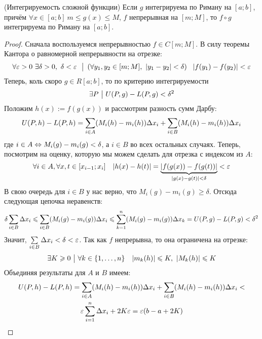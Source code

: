 \begin{theorem} (Интегрируемость сложной функции)
	Если $g$ интегрируема по Риману на $[a; b]$, причём $\forall x \in [a; b]\ m \le g(x) \le M$, $f$ непрерывная на $[m; M]$, то $f \circ g$ интегрируема по Риману на $[a; b]$.
\end{theorem}

\begin{proof}
	Сначала воспользуемся непрерывностью $f \in C[m; M]$. В силу теоремы Кантора о равномерной непрерывности на отрезке:
	\[
		\forall \eps > 0\ \exists \delta > 0,\ \delta < \eps\ \such \left(\forall y_1, y_2 \in [m; M],\ |y_1 - y_2| < \delta\right)\ \ |f(y_1) - f(y_2)| < \eps
	\]
	Теперь, коль скоро $g \in R[a; b]$, то по критерию интегрируемости
	\[
		\exists P \ \big|\  U(P, g) - L(P, g) < \delta^2
	\]
	Положим $h(x) := f(g(x))$ и рассмотрим разность сумм Дарбу:
	\[
		U(P, h) - L(P, h) = \sum\limits_{i \in A} (M_i(h) - m_i(h))\Delta x_i + \sum\limits_{i \in B} (M_i(h) - m_i(h)) \Delta x_i
	\]
	где $i \in A \Leftrightarrow M_i(g) - m_i(g) < \delta$, а $i \in B$ во всех остальных случаях. Теперь, посмотрим на оценку, которую мы можем сделать для отрезка с индексом из $A$:
	\[
		\forall i \in A, \forall x, t \in [x_{i - 1}; x_i] \quad |h(x) - h(t)| = \underbrace{|f(g(x)) - f(g(t))|}_{|g(x) - g(t)| < \delta} < \varepsilon
	\]
	В свою очередь для $i \in B$ у нас верно, что $M_i(g) - m_i(g) \ge \delta$. Отсюда следующая цепочка неравенств:
	\[
		\delta \sum\limits_{i \in B} \Delta x_i \leqslant \sum\limits_{i \in B} (M_i(g) - m_i(g)) \Delta x_i \leqslant \sum\limits_{k = 1}^n (M_i(g) - m_i(g)) \Delta x_k = U(P, g) - L(P, g) < \delta^2
	\]
	Значит, $\sum\limits_{i \in B} \Delta x_i < \delta < \varepsilon$. Так как $f$ непрерывна, то она ограничена на отрезке:
	\[
		\exists K \geqslant 0 \ \big|\  \forall k \in \{1, \ldots, n\} \quad |m_k(h)| \leqslant K,\ |M_k(h)| \leqslant K
	\]
	Объединяя результаты для $A$ и $B$ имеем:
	\begin{multline*}
		U(P, h) - L(P, h) = \sum\limits_{i \in A} (M_i(h) - m_i(h)) \Delta x_i + \sum\limits_{i \in B} (M_i(h) - m_i(h)) \Delta x_i <
		\\
		\varepsilon \sum\limits_{i = 1}^n \Delta x_i + 2K\varepsilon = \varepsilon (b - a + 2K)
	\end{multline*}
\end{proof}